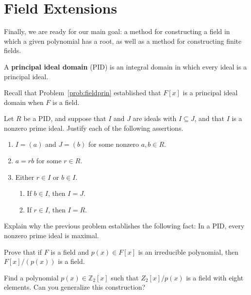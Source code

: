 \section{Field Extensions}

Finally, we are ready for our main goal: a method for constructing a field in which a given polynomial has a root, as well as a method for constructing finite fields.

\begin{definition}
A \textbf{principal ideal domain} (PID) is an integral domain in which every ideal is a principal ideal.
\end{definition}

Recall that Problem~\ref{prob:fieldprin} established that \(F[x]\) is a principal ideal domain when \(F\) is a field.

\begin{problem}
Let \(R\) be a PID, and suppose that \(I\) and \(J\) are ideals with \(I \subseteq J\), and that \(I\) is a nonzero prime ideal. Justify each of the following assertions.
\begin{enumerate}
  \item \(I = (a)\) and \(J = (b)\) for some nonzero \(a,b \in R\).
  \item \(a = rb\) for some \(r \in R\).
  \item Either \(r \in I\) or \(b \in I\).

  \begin{enumerate}
    \item If \(b \in I\), then \(I = J\).
    \item If \(r \in I\), then \(I = R\).
  \end{enumerate}
  \end{enumerate}
\end{problem}

\begin{problem}
Explain why the previous problem establishes the following fact: In a PID, every nonzero prime ideal is maximal.
\end{problem}

\begin{problem}
Prove that if \(F\) is a field and \(p(x) \in F[x]\) is an irreducible polynomial, then \(F[x]/(p(x))\) is a field.
\end{problem}

\begin{problem}
Find a polynomial \(p(x) \in \mathbb{Z}_2[x]\) such that \(Z_2[x]/p(x)\) is a field with eight elements. Can you generalize this construction?
\end{problem}

